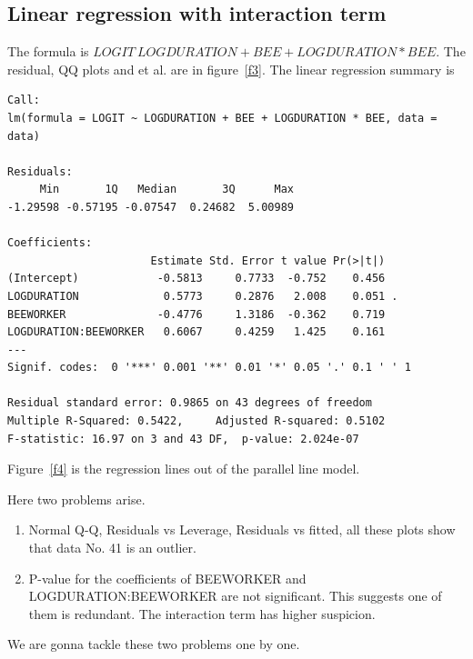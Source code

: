 \documentclass[a4paper,10pt]{article}
\begin{document}
\subsection{Linear regression with interaction term}
The formula is $LOGIT~LOGDURATION+BEE+LOGDURATION*BEE$. The residual, QQ plots and et al. are in figure~\ref{f3}. The linear regression summary is
\begin{verbatim}
Call:
lm(formula = LOGIT ~ LOGDURATION + BEE + LOGDURATION * BEE, data = data)

Residuals:
     Min       1Q   Median       3Q      Max
-1.29598 -0.57195 -0.07547  0.24682  5.00989

Coefficients:
                      Estimate Std. Error t value Pr(>|t|)
(Intercept)            -0.5813     0.7733  -0.752    0.456
LOGDURATION             0.5773     0.2876   2.008    0.051 .
BEEWORKER              -0.4776     1.3186  -0.362    0.719
LOGDURATION:BEEWORKER   0.6067     0.4259   1.425    0.161
---
Signif. codes:  0 '***' 0.001 '**' 0.01 '*' 0.05 '.' 0.1 ' ' 1

Residual standard error: 0.9865 on 43 degrees of freedom
Multiple R-Squared: 0.5422,     Adjusted R-squared: 0.5102
F-statistic: 16.97 on 3 and 43 DF,  p-value: 2.024e-07
\end{verbatim}

Figure~\ref{f4} is the regression lines out of the parallel line model.

Here two problems arise.
\begin{enumerate}
 \item Normal Q-Q, Residuals vs Leverage, Residuals vs fitted, all these plots show that data No. 41 is an outlier.
 \item P-value for the coefficients of BEEWORKER and LOGDURATION:BEEWORKER are not significant. This suggests one of them is redundant. The interaction term has higher suspicion.
\end{enumerate}
We are gonna tackle these two problems one by one.
\end{document}
